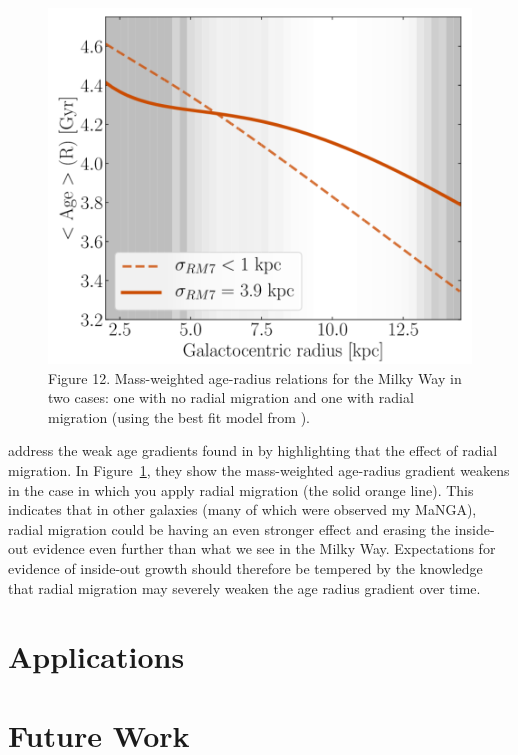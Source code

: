 \documentclass[preprint2]{aastex631}
\begin{document}
\begin{figure}[tb]
    \centering
    \includegraphics[width=\columnwidth]{frankel2019_fig12.png}
    \caption{\citet{Frankel+2019} Figure 12. Mass-weighted age-radius relations for the Milky Way in two cases: one with no radial migration and one with radial migration (using the best fit model from \citet{Frankel+2019}).}
    \label{fig:frankel_gradient}
\end{figure}

\citet{Frankel+2019} address the weak age gradients found in \citet{Goddard+2017} by highlighting that the effect of radial migration. In Figure~\ref{fig:frankel_gradient}, they show the mass-weighted age-radius gradient weakens in the case in which you apply radial migration (the solid orange line). This indicates that in other galaxies (many of which were observed my MaNGA), radial migration could be having an even stronger effect and erasing the inside-out evidence even further than what we see in the Milky Way. Expectations for evidence of inside-out growth should therefore be tempered by the knowledge that radial migration may severely weaken the age radius gradient over time.

\section{Applications}
\citep{Banerjee+2020}

\section{Future Work}
\citep{Hogg+2019}
\end{document}
